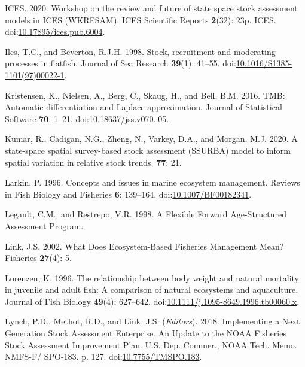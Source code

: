 \documentclass[]{article}
\begin{document}
\leavevmode\hypertarget{ref-ices2020Workshop}{}%
ICES. 2020. Workshop on the review and future of state space stock
assessment models in ICES (WKRFSAM). ICES Scientific Reports
\textbf{2}(32): 23p. ICES.
doi:\href{https://doi.org/10.17895/ices.pub.6004}{10.17895/ices.pub.6004}.

\leavevmode\hypertarget{ref-iles1998Stock}{}%
Iles, T.C., and Beverton, R.J.H. 1998. Stock, recruitment and moderating
processes in flatfish. Journal of Sea Research \textbf{39}(1): 41--55.
doi:\href{https://doi.org/10.1016/S1385-1101(97)00022-1}{10.1016/S1385-1101(97)00022-1}.

\leavevmode\hypertarget{ref-kristensen2016TMB}{}%
Kristensen, K., Nielsen, A., Berg, C., Skaug, H., and Bell, B.M. 2016.
TMB: Automatic differentiation and Laplace approximation. Journal of
Statistical Software \textbf{70}: 1--21.
doi:\href{https://doi.org/10.18637/jss.v070.i05}{10.18637/jss.v070.i05}.

\leavevmode\hypertarget{ref-kumar2020Statespace}{}%
Kumar, R., Cadigan, N.G., Zheng, N., Varkey, D.A., and Morgan, M.J.
2020. A state-space spatial survey-based stock assessment (SSURBA) model
to inform spatial variation in relative stock trends. \textbf{77}: 21.

\leavevmode\hypertarget{ref-larkin1996Concepts}{}%
Larkin, P. 1996. Concepts and issues in marine ecosystem management.
Reviews in Fish Biology and Fisheries \textbf{6}: 139--164.
doi:\href{https://doi.org/10.1007/BF00182341}{10.1007/BF00182341}.

\leavevmode\hypertarget{ref-legault1998Flexible}{}%
Legault, C.M., and Restrepo, V.R. 1998. A Flexible Forward
Age-Structured Assessment Program.

\leavevmode\hypertarget{ref-link2002What}{}%
Link, J.S. 2002. What Does Ecosystem-Based Fisheries Management Mean?
Fisheries \textbf{27}(4): 5.

\leavevmode\hypertarget{ref-lorenzen1996Relationship}{}%
Lorenzen, K. 1996. The relationship between body weight and natural
mortality in juvenile and adult fish: A comparison of natural ecosystems
and aquaculture. Journal of Fish Biology \textbf{49}(4): 627--642.
doi:\href{https://doi.org/10.1111/j.1095-8649.1996.tb00060.x}{10.1111/j.1095-8649.1996.tb00060.x}.

\leavevmode\hypertarget{ref-lynch2018Implementing}{}%
Lynch, P.D., Methot, R.D., and Link, J.S. (\emph{Editors}). 2018.
Implementing a Next Generation Stock Assessment Enterprise. An Update to
the NOAA Fisheries Stock Assessment Improvement Plan. U.S. Dep. Commer.,
NOAA Tech. Memo. NMFS-F/ SPO-183. p. 127.
doi:\href{https://doi.org/10.7755/TMSPO.183}{10.7755/TMSPO.183}.
\end{document}
